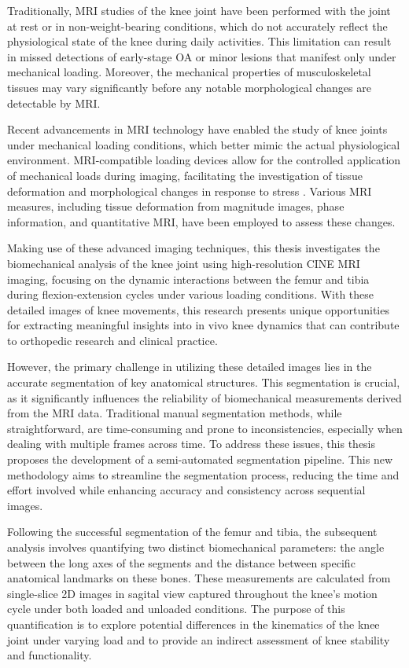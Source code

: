 \documentclass{micro-econ-thesis}
\begin{document}
Traditionally, MRI studies of the knee joint have been performed with the joint at rest or in non-weight-bearing conditions, which do not accurately reflect the physiological state of the knee during daily activities. \parencite{blankevoort_envelope_1988} This limitation can result in missed detections of early-stage OA or minor lesions that manifest only under mechanical loading. Moreover, the mechanical properties of musculoskeletal tissues may vary significantly before any notable morphological changes are detectable by MRI.

Recent advancements in MRI technology have enabled the study of knee joints under mechanical loading conditions, which better mimic the actual physiological environment. MRI-compatible loading devices allow for the controlled application of mechanical loads during imaging, facilitating the investigation of tissue deformation and morphological changes in response to stress \parencite{shimozaki_extrusion_2023} \parencite{conconi_-vivo_2023} \parencite{jogi_device_2022}. Various MRI measures, including tissue deformation from magnitude images, phase information, and quantitative MRI, have been employed to assess these changes. 

Making use of these advanced imaging techniques, this thesis investigates the biomechanical analysis of the knee joint using high-resolution CINE MRI imaging, focusing on the dynamic interactions between the femur and tibia during flexion-extension cycles under various loading conditions. With these detailed images of knee movements, this research presents unique opportunities for extracting meaningful insights into in vivo knee dynamics that can contribute to orthopedic research and clinical practice.

However, the primary challenge in utilizing these detailed images lies in the accurate segmentation of key anatomical structures. This segmentation is crucial, as it significantly influences the reliability of biomechanical measurements derived from the MRI data. Traditional manual segmentation methods, while straightforward, are time-consuming and prone to inconsistencies, especially when dealing with multiple frames across time. To address these issues, this thesis proposes the development of a semi-automated segmentation pipeline. This new methodology aims to streamline the segmentation process, reducing the time and effort involved while enhancing accuracy and consistency across sequential images.

Following the successful segmentation of the femur and tibia, the subsequent analysis involves quantifying two distinct biomechanical parameters: the angle between the long axes of the segments and the distance between specific anatomical landmarks on these bones. These measurements are calculated from single-slice 2D images in sagital view captured throughout the knee's motion cycle under both loaded and unloaded conditions. The purpose of this quantification is to explore potential differences in the kinematics of the knee joint under varying load and to provide an indirect assessment of knee stability and functionality. 
\end{document}
